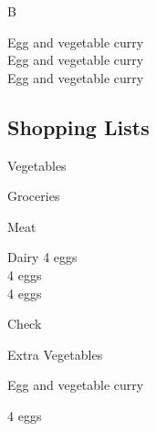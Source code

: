 		\begin{menu}{B}
    
    \begin{recipelist}
    Egg and vegetable curry\\
    Egg and vegetable curry\\
    Egg and vegetable curry\\
    
    \end{recipelist}
  
    \subsection*{Shopping Lists}
      \begin{shoppinglist}{Vegetables}
      \end{shoppinglist}%
      \begin{shoppinglist}{Groceries}
      \end{shoppinglist}%
      \par\vfil %
      \begin{shoppinglist}{Meat}
      \end{shoppinglist}%
      \begin{shoppinglist}{Dairy}
      4  eggs \\ 
      4  eggs \\ 
      4  eggs \\ 
      \end{shoppinglist}%
      \par\vfil %
      \vfil\clearpage %
      \begin{shoppinglist}{Check}
      \end{shoppinglist}%
      \begin{shoppinglist}{Extra Vegetables}
      \end{shoppinglist}%
      \par\vfil %
    \vfil\clearpage
  
    \begin{recipe}{2}{Egg and vegetable curry}%
    
		\begin{ingredients}
		4  eggs  \\
	
		\end{ingredients}
	

\end{recipe}
\end{menu}
